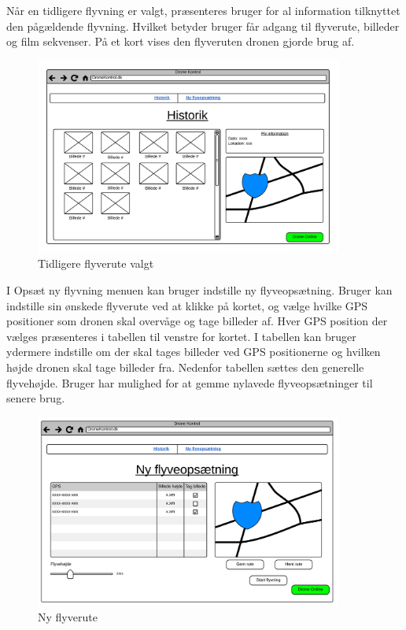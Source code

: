 \newpage

Når en tidligere flyvning er valgt, præsenteres bruger for al information tilknyttet den pågældende flyvning. Hvilket betyder bruger får adgang til flyverute, billeder og film sekvenser. På et kort vises den flyveruten dronen gjorde brug af.

\vspace{-5pt}
\begin{figure}[H]
	\centering
	\includegraphics[width=0.9\textwidth]{Billeder/UI_mockups/archive_choosen.png}
	\vspace{-.5cm}
	\caption{Tidligere flyverute valgt}
	\label{fig:mockup_archive_choosen}
\end{figure}


I Opsæt ny flyvning menuen kan bruger indstille ny flyveopsætning. 
Bruger kan indstille sin ønskede flyverute ved at klikke på kortet, og vælge hvilke GPS positioner som dronen skal overvåge og tage billeder af. 
Hver GPS position der vælges præsenteres i tabellen til venstre for kortet. 
I tabellen kan bruger ydermere indstille om der skal tages billeder ved GPS positionerne og hvilken højde dronen skal tage billeder fra. Nedenfor tabellen sættes den generelle flyvehøjde.
Bruger har mulighed for at gemme nylavede flyveopsætninger til senere brug.

\vspace{-5pt}
\begin{figure}[H]
	\centering
	\includegraphics[width=0.9\textwidth]{Billeder/UI_mockups/setup_new_flight.png}
	\vspace{-.2cm}
	\caption{Ny flyverute}
	\label{fig:mockup_setup_new_flight}
\end{figure}

 
